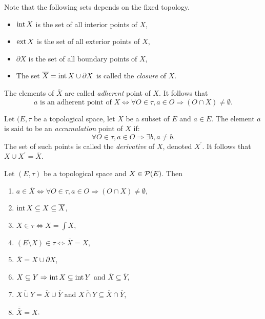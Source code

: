 \begin{notation}
Note that the following sets depends on the fixed topology.
    \begin{itemize}
        \item $\operatorname{int} X$ is the set of all interior points of $X$,
        \item $\operatorname{ext} X$ is the set of all exterior points of $X$,
        \item $\partial X$ is the set of all boundary points of $X$,
        \item The set $\overline X = \operatorname{int} X \cup \partial X$ is called the \emph{closure} of $X$.
    \end{itemize}
\end{notation}

\begin{remark}
	The elements of $\overline X$ are called \emph{adherent} point of $X$. It follows that
	\begin{equation*}
		a \text{ is an adherent point of } X \Leftrightarrow \forall O \in \tau, a \in O \Rightarrow (O \cap X) \neq \emptyset.
	\end{equation*}
\end{remark}

\begin{definition}
	Let $(E,\tau$ be a topological space, let $X$ be a subset of $E$ and $a \in E$. The element $a$ is said to be an \emph{accumulation} point of $X$ if:
	\begin{equation*}
	\forall O \in \tau, a \in O \Rightarrow \exists b, a \neq b.	
	\end{equation*}
	The set of such points is called the \emph{derivative} of $X$, denoted $X^\prime$. It follows that $X \cup X^\prime = \overline X$.
\end{definition}

\begin{proposition}
    Let $(E, \tau)$ be a topological space and $X \in \mathcal{P}(E)$. Then
    \begin{enumerate}
        \item $a \in \overline{X} \Leftrightarrow \forall O \in \tau , a \in O \Rightarrow (O \cap X) \neq \emptyset$,
        \item $\operatorname{int} X \subseteq X \subseteq \overline{X}$,
        \item $X \in \tau \Leftrightarrow X = \int X$,
        \item $(E \setminus X) \in \tau \Leftrightarrow \overline{X} = X$,
        \item $\overline{X} = X \cup \partial X$,
        \item $X \subseteq Y \Rightarrow \operatorname{int} X \subseteq \operatorname{int} Y$ and $\overline{X} \subseteq \overline{Y}$,
        \item $\overline{X \cup Y} = \overline{X} \cup \overline{Y}$ and $\overline{X \cap Y} \subseteq \overline{X} \cap \overline{Y}$,
        \item $\overline{\overline{X}} = X$.
    \end{enumerate}
\end{proposition}

